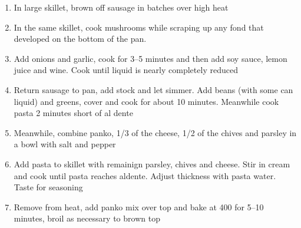 \documentclass[]{report}
\begin{document}
            {\begin{enumerate}    %
                  \item In large skillet, brown off sausage in batches over high heat
                  \item In the same skillet, cook mushrooms while scraping up any fond that developed on the bottom of the pan.
                  \item Add onions and garlic, cook for 3--5 minutes and then add soy sauce, lemon juice and wine. Cook until liquid is nearly completely reduced 
                  \item Return sausage to pan, add stock and let simmer. Add beans (with some can liquid) and greens, cover and cook for about 10 minutes. Meanwhile cook pasta 2 minutes short of al dente
                  \item  Meanwhile, combine panko, 1/3 of the cheese, 1/2 of the chives and parsley in a bowl with salt and pepper 
                  \item Add pasta to skillet with remainign parsley, chives and cheese. Stir in cream and cook until pasta reaches aldente. Adjust thickness with pasta water. Taste for seasoning 
                  \item Remove from heat, add panko mix over top and bake at 400 for 5--10 minutes, broil as necessary to brown top 
            \end{enumerate}}
\end{document}
